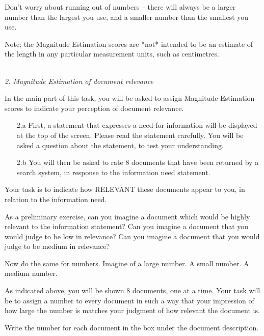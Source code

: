 Don't worry about running out of numbers -- there will always be a
larger number than the largest you use, and a smaller number than the
smallest you use.

Note: the Magnitude Estimation scores are *not* intended to be an
estimate of the length in any particular measurement units, such as
centimetres.

~\\

\noindent \emph{2. Magnitude Estimation of document relevance}

In the main part of this task, you will be asked to assign Magnitude
Estimation scores to indicate your perception of document
relevance. 

\begin{enumerate}
\item[2.a] First, a statement that expresses a need for information will be
displayed at the top of the screen.  Please read the statement
carefully.  You will be asked a question about the statement, to test
your understanding.

\item[2.b] You will then be asked to rate 8 documents that have been returned
by a search system, in response to the information need statement.
\end{enumerate}


Your task is to indicate how RELEVANT these documents appear to you, in
relation to the information need. 

As a preliminary exercise, can you imagine a document which would be
highly relevant to the information statement? Can you imagine a document
that you would judge to be low in relevance? Can you imagine a document
that you would judge to be medium in relevance? 

Now do the same for numbers. Imagine of a large number. A small
number. A medium number.

As indicated above, you will be shown 8 documents, one at a time. Your
task will be to assign a number to every document in such a way that
your impression of how large the number is matches your judgment of how
relevant the document is. 

Write the number for each document in the box under the document
description.  

